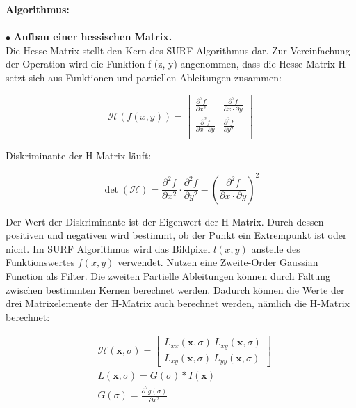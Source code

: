 \textbf{Algorithmus:}\\
\\
$\bullet$ \textbf{Aufbau einer hessischen Matrix.}\\
Die Hesse-Matrix stellt den Kern des SURF Algorithmus dar. Zur Vereinfachung der Operation wird die Funktion f (z, y) angenommen, dass die Hesse-Matrix H setzt sich aus Funktionen und partiellen Ableitungen zusammen:

\begin{equation}
   \mathcal{H}(f(x,y)) = \begin{bmatrix}
   \frac{\partial^{2}f}{\partial x^{2}} & \frac{\partial^{2}f}{\partial x \cdot \partial y} \\
   \frac{\partial^{2}f}{\partial x \cdot \partial y} & \frac{\partial^{2}f}{\partial y^{2}} \\   
   \end{bmatrix}
\end{equation}

 Diskriminante der H-Matrix läuft:
 
\begin{equation}
   \det(\mathcal{H}) = \frac{\partial^{2}f}{\partial x^{2}} \cdot \frac{\partial^{2}f}{\partial y^{2}} - (\frac{\partial^{2}f}{\partial x \cdot \partial y})^2  
\end{equation}

Der Wert der Diskriminante ist der Eigenwert der H-Matrix. Durch dessen positiven und negativen wird bestimmt, ob der Punkt ein Extrempunkt ist oder nicht. Im SURF Algorithmus wird das Bildpixel $l(x,y)$ anstelle des Funktionswertes $f(x,y)$ verwendet. Nutzen eine Zweite-Order Gaussian Function als Filter. Die zweiten Partielle Ableitungen können durch Faltung zwischen bestimmten Kernen berechnet werden. Dadurch können die Werte der drei Matrixelemente der H-Matrix auch berechnet werden, nämlich die H-Matrix berechnet:

\begin{equation}
\begin{split}
   &\mathcal{H}(\textbf{x},\sigma) = \begin{bmatrix}
   L_{xx}(\textbf{x},\sigma)\ L_{xy}(\textbf{x},\sigma) \\
   L_{xy}(\textbf{x},\sigma)\ L_{yy}(\textbf{x},\sigma)
   \end{bmatrix} \\   
   &L(\textbf{x},\sigma) = G(\sigma)*I(\textbf{x}) \\  
   &G(\sigma) = \frac{\partial^{2}g(\sigma)}{\partial x^{2}}      
\end{split}
\end{equation}


